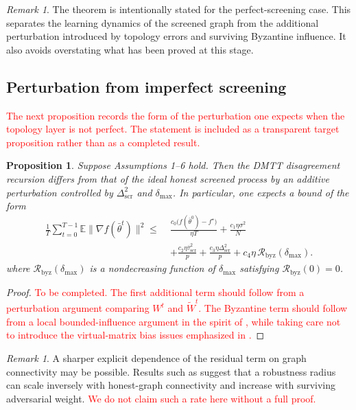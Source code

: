 \documentclass[journal]{IEEEtran}
\newtheorem{proposition}[theorem]{Proposition}
\theoremstyle{definition}
\theoremstyle{remark}
\newtheorem{remark}[theorem]{Remark}
\begin{document}
\begin{remark}
The theorem is intentionally stated for the perfect-screening case. This separates the learning dynamics of the screened graph from the additional perturbation introduced by topology errors and surviving Byzantine influence. It also avoids overstating what has been proved at this stage.
\end{remark}

\subsection{Perturbation from imperfect screening}

\textcolor{red}{The next proposition records the form of the perturbation one expects when the topology layer is not perfect. The statement is included as a transparent target proposition rather than as a completed result.}

\begin{proposition}
Suppose Assumptions 1--6 hold. Then the DMTT disagreement recursion differs from that of the ideal honest screened process by an additive perturbation controlled by $\Delta_{\mathrm{scr}}^2$ and $\delta_{\max}$. In particular, one expects a bound of the form
\begin{equation}
\begin{aligned}
\frac{1}{T}\sum_{t=0}^{T-1}\mathbb E\|\nabla f(\bar\theta^t)\|^2
\le\;&
\frac{c_0\big(f(\bar\theta^0)-f^\star\big)}{\eta T}
+
\frac{c_1\eta\sigma^2}{N} \\
&+
\frac{c_2\eta\bar\tau_{\mathrm{scr}}^2}{p}
+
\frac{c_3\eta\Delta_{\mathrm{scr}}^2}{p}
+
c_4\eta\,\mathcal R_{\mathrm{byz}}(\delta_{\max}).
\end{aligned}
\end{equation}
where $\mathcal R_{\mathrm{byz}}(\delta_{\max})$ is a nondecreasing function of $\delta_{\max}$ satisfying $\mathcal R_{\mathrm{byz}}(0)=0$.
\end{proposition}

\begin{proof}
\textcolor{red}{To be completed. The first additional term should follow from a perturbation argument comparing $W^t$ and $\widetilde W^t$. The Byzantine term should follow from a local bounded-influence argument in the spirit of \cite{he2022byzantine}, while taking care not to introduce the virtual-matrix bias issues emphasized in \cite{10208131}.}
\end{proof}

\begin{remark}
A sharper explicit dependence of the residual term on graph connectivity may be possible. Results such as \cite{he2022byzantine} suggest that a robustness radius can scale inversely with honest-graph connectivity and increase with surviving adversarial weight. \textcolor{red}{We do not claim such a rate here without a full proof.}
\end{remark}
\end{document}

